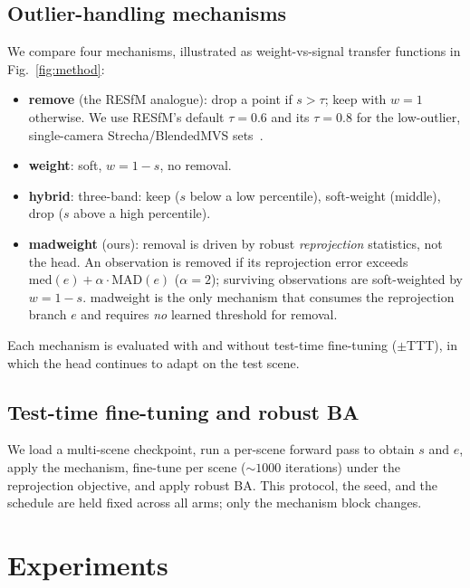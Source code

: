 \documentclass{article}
\newcommand{\mad}{madweight}
\begin{document}
\subsection{Outlier-handling mechanisms}
We compare four mechanisms, illustrated as weight-vs-signal transfer functions in
Fig.~\ref{fig:method}:
\begin{itemize}\itemsep2pt
\item\textbf{remove} (the RESfM analogue): drop a point if $s>\tau$; keep with $w{=}1$
otherwise. We use RESfM's default $\tau{=}0.6$ and its $\tau{=}0.8$ for the low-outlier,
single-camera Strecha/BlendedMVS sets~\citep{resfm}.
\item\textbf{weight}: soft, $w=1-s$, no removal.
\item\textbf{hybrid}: three-band: keep ($s$ below a low percentile), soft-weight (middle),
drop ($s$ above a high percentile).
\item\textbf{\mad{}} (ours): removal is driven by robust \emph{reprojection} statistics, not
the head. An observation is removed if its reprojection error exceeds
$\mathrm{med}(e)+\alpha\cdot\mathrm{MAD}(e)$ ($\alpha{=}2$); surviving observations are
soft-weighted by $w=1-s$. \mad{} is the only mechanism that consumes the reprojection
branch $e$ and requires \emph{no} learned threshold for removal.
\end{itemize}
Each mechanism is evaluated with and without test-time fine-tuning ($\pm$TTT), in which the
head continues to adapt on the test scene.

\subsection{Test-time fine-tuning and robust BA}
We load a multi-scene checkpoint, run a per-scene forward pass to obtain $s$ and $e$, apply
the mechanism, fine-tune per scene ($\sim\!1000$ iterations) under the reprojection
objective, and apply robust BA. This protocol, the seed, and the schedule are held fixed
across all arms; only the mechanism block changes.

\section{Experiments}
\end{document}

